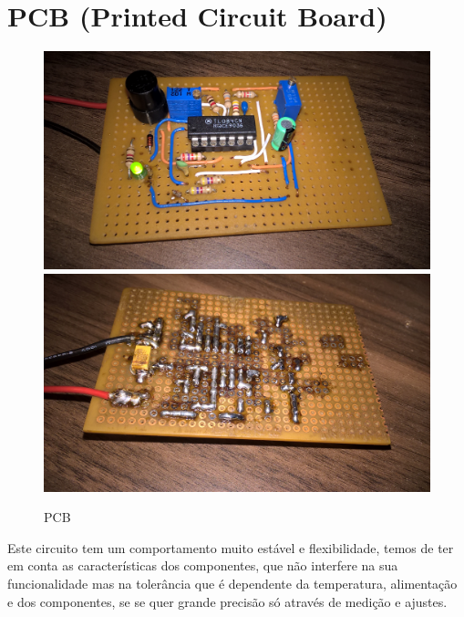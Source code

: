 \documentclass[titlepage, a4paper, 10pt, reqno, openany]{report}
\begin{document}
\section{PCB (Printed Circuit Board)}
\begin{figure}[ht]
\begin{center}
	\includegraphics[scale=0.07]{./image/placa_1.jpg} \hspace{0.2cm}
	\includegraphics[scale=0.07]{./image/placa_2.jpg}
\end{center}
\caption{PCB}
\end{figure}\par
Este circuito tem um comportamento muito estável e flexibilidade, temos de ter em conta as características dos componentes, que não interfere na sua funcionalidade mas na tolerância que é dependente da temperatura, alimentação e dos componentes, se se quer grande precisão só através de medição e ajustes.
\end{document}
